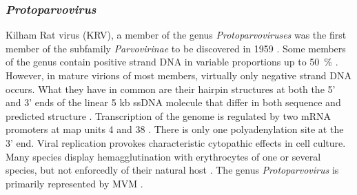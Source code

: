 

\subsubsection{\textit{Protoparvovirus}}
Kilham Rat virus (KRV), a member of the genus \textit{Protoparvoviruses} was the first member of the subfamily \textit{Parvovirinae} to be discovered in 1959 \cite{pmid13669314}. Some members of the genus contain positive strand DNA in variable proportions up to 50~\% \cite{pmid6694260}. However, in mature virions of most members, virtually only negative strand DNA occurs. What they have in common are their hairpin structures at both the 5’ and 3’ ends of the linear 5 kb ssDNA molecule that differ in both sequence and predicted structure \cite{pmid6298737}. Transcription of the genome is regulated by two mRNA promoters at map units 4 and 38 \cite{pmid6828378}. There is only one polyadenylation site at the 3’ end. 
Viral replication provokes characteristic cytopathic effects in cell culture. Many species display hemagglutination with erythrocytes of one or several species, but not enforcedly of their natural host \cite{pmid5083410}. The genus \textit{Protoparvovirus} is primarily represented by MVM \cite{icvt, protoparvovirus}.       


